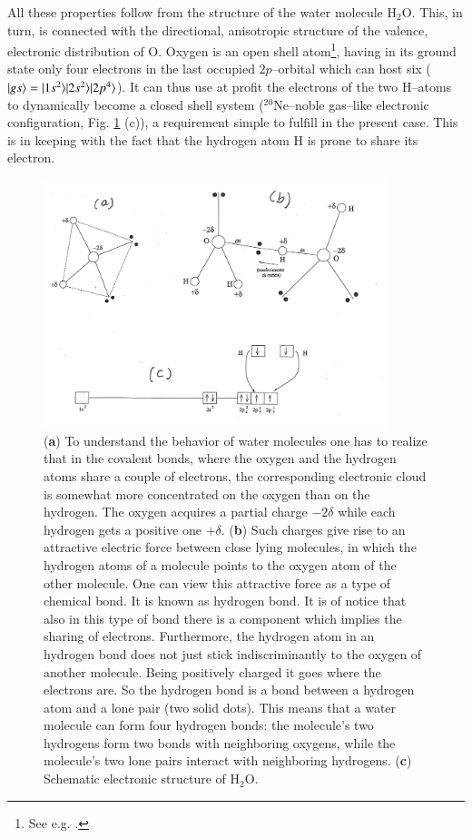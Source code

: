 \begin{subappendices}
All these properties follow from the structure of the water molecule H$_2$O. This, in turn, is connected with the directional, anisotropic structure of the valence, electronic distribution of O. Oxygen is an open shell atom\footnote{See e.g. \cite{Greiner:98}.}, having in its ground state only four electrons in the last occupied $2p$--orbital which can host six ($|{gs} \rangle=|{1s^2} \rangle|{2s^2} \rangle|{2p^4} \rangle$). It can thus use at profit the electrons of the two H--atoms to dynamically become a closed shell system ($^{20}$Ne--noble gas--like electronic configuration, Fig. \ref{fig6G5} (c)), a requirement simple to fulfill in the present case. This is in keeping with the fact that the hydrogen atom H is prone to share its electron.
\begin{figure}
\centerline{\includegraphics[width=10cm]{C8/figsC8/fig6G5.pdf}}
\caption{(\textbf{a}) To understand the behavior of water molecules one has to realize that in the covalent bonds, where the oxygen and the hydrogen atoms share a couple of electrons, the corresponding electronic cloud is somewhat more concentrated on the oxygen than on the hydrogen. The oxygen acquires a partial charge $-2\delta$ while each hydrogen gets a positive one $+\delta$. (\textbf{b}) Such charges give rise to an attractive electric force between  close lying molecules, in which the hydrogen atoms of a molecule points to the oxygen atom of the other molecule. One can view this attractive force as a type of chemical bond. It is known as hydrogen bond. It is of notice that also in this type of bond there is a component which implies the sharing of electrons. Furthermore, the hydrogen atom in an hydrogen bond does not just stick indiscriminantly to the  oxygen of another molecule. Being positively charged it goes where the electrons are. So the hydrogen bond is a bond between a hydrogen atom and a lone pair (two solid dots). This means that a water molecule can form four hydrogen bonds: the molecule's two hydrogens form two bonds with neighboring oxygens, while the molecule's two lone pairs interact with neighboring hydrogens. (\textbf{c}) Schematic electronic structure of H$_2$O.}\label{fig6G5}

\end{figure}
\end{subappendices}
